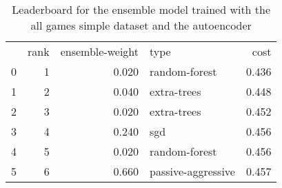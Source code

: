 \begin{table}[]
	\centering
	\begin{tabular}{lrrlr}
		  & rank & ensemble-weight & type               & cost  \\
		0 & 1    & 0.020           & random-forest      & 0.436 \\
		1 & 2    & 0.040           & extra-trees        & 0.448 \\
		2 & 3    & 0.020           & extra-trees        & 0.452 \\
		3 & 4    & 0.240           & sgd                & 0.456 \\
		4 & 5    & 0.020           & random-forest      & 0.456 \\
		5 & 6    & 0.660           & passive-aggressive & 0.457 \\
	\end{tabular}

	\caption{Leaderboard for the ensemble model trained with the all games simple dataset and the autoencoder}
	\label{tab:lb-all-games-simple-v2-autoencode}
\end{table}

